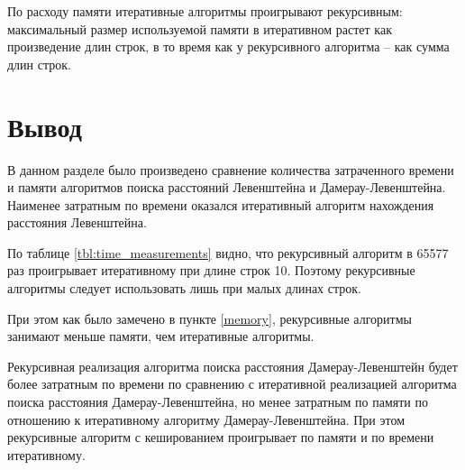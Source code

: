 По расходу памяти итеративные алгоритмы проигрывают рекурсивным: максимальный размер используемой памяти в итеративном растет
как произведение длин строк, в то время как у рекурсивного алгоритма --
как сумма длин строк.


\section*{Вывод}

В данном разделе было произведено сравнение количества затраченного времени и памяти алгоритмов поиска расстояний Левенштейна и
Дамерау-Левенштейна. Наименее затратным по времени оказался итеративный алгоритм нахождения расстояния Левенштейна.

По таблице \ref{tbl:time_measurements} видно, что рекурсивный алгоритм в 65577 раз проигрывает итеративному при длине строк 10. Поэтому рекурсивные алгоритмы следует использовать лишь при малых длинах строк.

При этом как было замечено в пункте \ref{memory}, рекурсивные алгоритмы занимают меньше памяти, чем итеративные алгоритмы.

Рекурсивная реализация алгоритма поиска расстояния Дамерау-Левенштейн будет более затратным по времени по сравнению с итеративной реализацией алгоритма поиска расстояния Дамерау-Левенштейна, но менее затратным по памяти по отношению к итеративному алгоритму Дамерау-Левенштейна. При этом рекурсивные алгоритм с кешированием проигрывает по памяти и по времени итеративному.